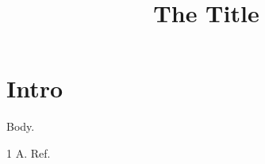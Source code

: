 \documentclass{bmcart}
\begin{document}
\begin{frontmatter}
\begin{fmbox}
\title{The Title}
\author[addressref={aff1},noteref={n1},email={j@x.org}]{ }
\author[addressref={aff1,aff2}]{ }
\address[id=aff1]{, , }
\address[id=aff2]{, , }
\begin{artnotes}
\end{artnotes}
\end{fmbox}
\end{frontmatter}
\section{Intro} Body.
\begin{backmatter}
\begin{thebibliography}{1} A. Ref.\end{thebibliography}
\end{backmatter}
\end{document}
